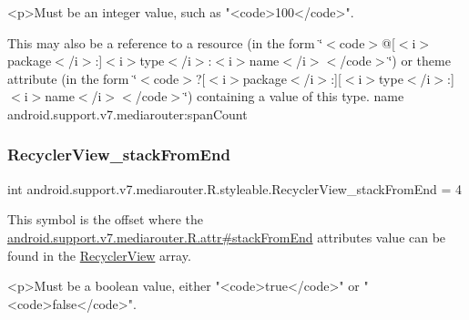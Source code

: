 \begin{DoxyVerb}      <p>Must be an integer value, such as "<code>100</code>".
\end{DoxyVerb}
 

This may also be a reference to a resource (in the form \char`\"{}$<$code$>$@\mbox{[}$<$i$>$package$<$/i$>$\+:\mbox{]}$<$i$>$type$<$/i$>$\+:$<$i$>$name$<$/i$>$$<$/code$>$\char`\"{}) or theme attribute (in the form \char`\"{}$<$code$>$?\mbox{[}$<$i$>$package$<$/i$>$\+:\mbox{]}\mbox{[}$<$i$>$type$<$/i$>$\+:\mbox{]}$<$i$>$name$<$/i$>$$<$/code$>$\char`\"{}) containing a value of this type.  name android.\+support.\+v7.\+mediarouter\+:span\+Count \mbox{\label{classandroid_1_1support_1_1v7_1_1mediarouter_1_1R_1_1styleable_a6cee8e7efa348fbf26340673590b5287}} 
\subsubsection{\texorpdfstring{Recycler\+View\+\_\+stack\+From\+End}{RecyclerView\_stackFromEnd}}
{\footnotesize\ttfamily int android.\+support.\+v7.\+mediarouter.\+R.\+styleable.\+Recycler\+View\+\_\+stack\+From\+End = 4\hspace{0.3cm}{\ttfamily [static]}}

This symbol is the offset where the \hyperlink{classandroid_1_1support_1_1v7_1_1mediarouter_1_1R_1_1attr_a26c262877113677509b313d3cc45bc3f}{android.\+support.\+v7.\+mediarouter.\+R.\+attr\#stack\+From\+End} attribute\textquotesingle{}s value can be found in the \hyperlink{classandroid_1_1support_1_1v7_1_1mediarouter_1_1R_1_1styleable_af634dfe19333cdc00d399d1f00635e93}{Recycler\+View} array.

\begin{DoxyVerb}      <p>Must be a boolean value, either "<code>true</code>" or "<code>false</code>".
\end{DoxyVerb}
 

